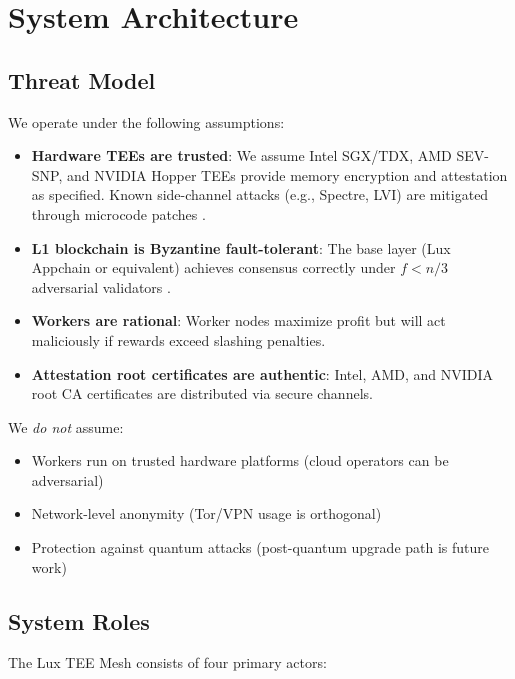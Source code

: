 \documentclass[11pt,letterpaper]{article}
\begin{document}
\section{System Architecture}

\subsection{Threat Model}

We operate under the following assumptions:

\begin{itemize}
  \item \textbf{Hardware TEEs are trusted}: We assume Intel SGX/TDX, AMD SEV-SNP, and NVIDIA Hopper TEEs provide memory encryption and attestation as specified. Known side-channel attacks (e.g., Spectre, LVI) are mitigated through microcode patches \cite{sgx-attacks}.

  \item \textbf{L1 blockchain is Byzantine fault-tolerant}: The base layer (Lux Appchain or equivalent) achieves consensus correctly under $f < n/3$ adversarial validators \cite{avalanche-consensus}.

  \item \textbf{Workers are rational}: Worker nodes maximize profit but will act maliciously if rewards exceed slashing penalties.

  \item \textbf{Attestation root certificates are authentic}: Intel, AMD, and NVIDIA root CA certificates are distributed via secure channels.
\end{itemize}

We \textit{do not} assume:
\begin{itemize}
  \item Workers run on trusted hardware platforms (cloud operators can be adversarial)
  \item Network-level anonymity (Tor/VPN usage is orthogonal)
  \item Protection against quantum attacks (post-quantum upgrade path is future work)
\end{itemize}

\subsection{System Roles}

The Lux TEE Mesh consists of four primary actors:
\end{document}
